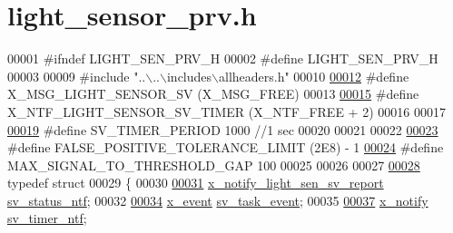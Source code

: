 \hypertarget{a00024_source}{\section{light\+\_\+sensor\+\_\+prv.\+h}
\label{a00024_source}
}

\begin{DoxyCode}
00001 \textcolor{preprocessor}{#ifndef LIGHT\_SEN\_PRV\_H}
00002 \textcolor{preprocessor}{#define LIGHT\_SEN\_PRV\_H}
00003 
00009 \textcolor{preprocessor}{#include "..\(\backslash\)..\(\backslash\)includes\(\backslash\)allheaders.h"} 
00010 
\hypertarget{a00024_source_l00012}{}\hyperlink{a00024_a5877f449ae4b7e77914fedf212c3d01f}{00012} \textcolor{preprocessor}{#define X\_MSG\_LIGHT\_SENSOR\_SV                           (X\_MSG\_FREE)}
00013 
\hypertarget{a00024_source_l00015}{}\hyperlink{a00024_ad7dfa3ed8d8d926ba462f9e951f1b391}{00015} \textcolor{preprocessor}{#define X\_NTF\_LIGHT\_SENSOR\_SV\_TIMER                                 (X\_NTF\_FREE + 2)}
00016 
00017 
\hypertarget{a00024_source_l00019}{}\hyperlink{a00024_a8a535456285f4602701c814d7b69cc68}{00019} \textcolor{preprocessor}{#define SV\_TIMER\_PERIOD                             1000  //1 sec}
00020 
00021 
00022 
\hypertarget{a00024_source_l00023}{}\hyperlink{a00024_aa88a423475bb5b13601785eed80fb1b9}{00023} \textcolor{preprocessor}{#define FALSE\_POSITIVE\_TOLERANCE\_LIMIT                              (2E8) - 1}
\hypertarget{a00024_source_l00024}{}\hyperlink{a00024_a4131fea6179b36b90522dd6a9ecc0a73}{00024} \textcolor{preprocessor}{#define MAX\_SIGNAL\_TO\_THRESHOLD\_GAP                                 100}
00025 
00026 
00027 
\hypertarget{a00024_source_l00028}{}\hyperlink{a00024}{00028} \textcolor{keyword}{typedef} \textcolor{keyword}{struct}
00029 \{
00030 
\hypertarget{a00024_source_l00031}{}\hyperlink{a00024_a35ce77844e6990e2537b2f11cd2d5cca}{00031}       \hyperlink{a00018_d0/d66/a00858}{x\_notify\_light\_sen\_sv\_report}               
      \hyperlink{a00024_a35ce77844e6990e2537b2f11cd2d5cca}{sv\_status\_ntf};
00032 
\hypertarget{a00024_source_l00034}{}\hyperlink{a00024_a43c345f39ea3aefbb60ef1ef57fe5d83}{00034}       \hyperlink{a00036_de/d37/a00849}{x\_event}                         \hyperlink{a00024_a43c345f39ea3aefbb60ef1ef57fe5d83}{sv\_task\_event};
00035 
\hypertarget{a00024_source_l00037}{}\hyperlink{a00024_ada91b200053f2d93e3639dc4ee3415b4}{00037}       \hyperlink{a00036_df/d4c/a00851}{x\_notify}                                   \hyperlink{a00024_ada91b200053f2d93e3639dc4ee3415b4}{sv\_timer\_ntf};

\end{DoxyCode}
